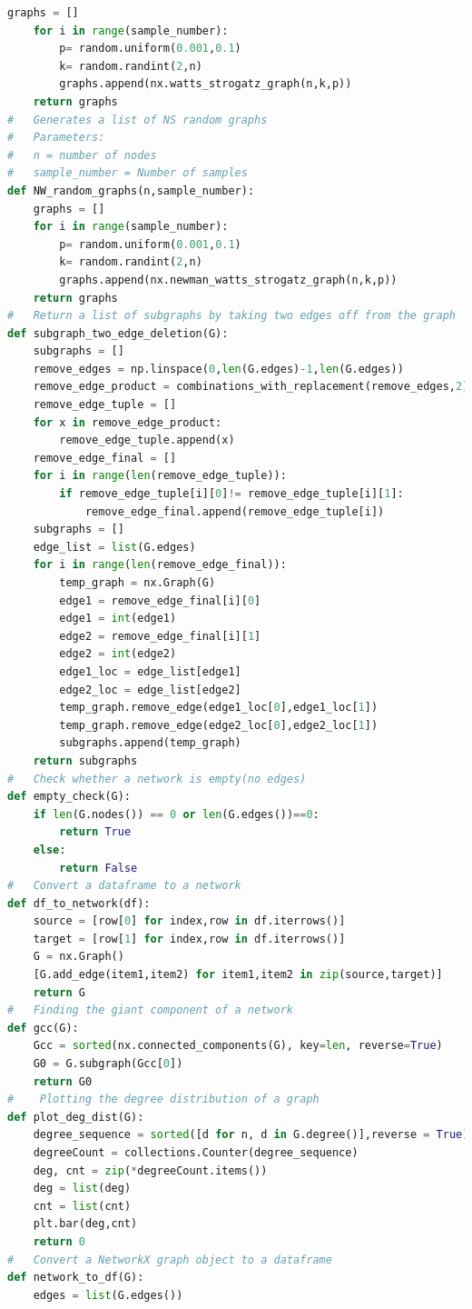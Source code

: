 \documentclass[12pt]{article}
\begin{document}
\begin{lstlisting}[language=Python,breaklines=true]
    graphs = []
    for i in range(sample_number):
        p= random.uniform(0.001,0.1)
        k= random.randint(2,n)
        graphs.append(nx.watts_strogatz_graph(n,k,p))
    return graphs
#   Generates a list of NS random graphs
#   Parameters:
#   n = number of nodes
#   sample_number = Number of samples
def NW_random_graphs(n,sample_number):
    graphs = []
    for i in range(sample_number):
        p= random.uniform(0.001,0.1)
        k= random.randint(2,n)
        graphs.append(nx.newman_watts_strogatz_graph(n,k,p))
    return graphs
#   Return a list of subgraphs by taking two edges off from the graph
def subgraph_two_edge_deletion(G):
    subgraphs = []
    remove_edges = np.linspace(0,len(G.edges)-1,len(G.edges))
    remove_edge_product = combinations_with_replacement(remove_edges,2)
    remove_edge_tuple = []
    for x in remove_edge_product:
        remove_edge_tuple.append(x)
    remove_edge_final = []
    for i in range(len(remove_edge_tuple)):
        if remove_edge_tuple[i][0]!= remove_edge_tuple[i][1]:
            remove_edge_final.append(remove_edge_tuple[i])
    subgraphs = []
    edge_list = list(G.edges)
    for i in range(len(remove_edge_final)):
        temp_graph = nx.Graph(G)
        edge1 = remove_edge_final[i][0]
        edge1 = int(edge1)
        edge2 = remove_edge_final[i][1]
        edge2 = int(edge2)
        edge1_loc = edge_list[edge1]
        edge2_loc = edge_list[edge2]
        temp_graph.remove_edge(edge1_loc[0],edge1_loc[1])
        temp_graph.remove_edge(edge2_loc[0],edge2_loc[1])
        subgraphs.append(temp_graph)
    return subgraphs
#   Check whether a network is empty(no edges)
def empty_check(G):
    if len(G.nodes()) == 0 or len(G.edges())==0:
        return True
    else:
        return False
#   Convert a dataframe to a network
def df_to_network(df):
    source = [row[0] for index,row in df.iterrows()]
    target = [row[1] for index,row in df.iterrows()]
    G = nx.Graph()
    [G.add_edge(item1,item2) for item1,item2 in zip(source,target)]
    return G
#   Finding the giant component of a network
def gcc(G):
    Gcc = sorted(nx.connected_components(G), key=len, reverse=True)
    G0 = G.subgraph(Gcc[0])
    return G0
#    Plotting the degree distribution of a graph
def plot_deg_dist(G):
    degree_sequence = sorted([d for n, d in G.degree()],reverse = True)
    degreeCount = collections.Counter(degree_sequence)
    deg, cnt = zip(*degreeCount.items())
    deg = list(deg)
    cnt = list(cnt)
    plt.bar(deg,cnt)
    return 0
#   Convert a NetworkX graph object to a dataframe
def network_to_df(G):
    edges = list(G.edges())

\end{lstlisting}
\end{document}
